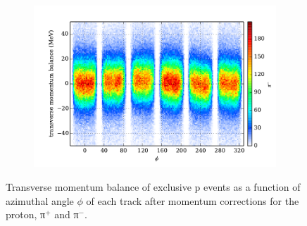 \begin{figure}
\begin{center}
\begin{subfigure}{0.4\columnwidth}
\end{subfigure}
\begin{subfigure}{0.4\columnwidth}
    \includegraphics[width=\columnwidth]{figures/pcor/pcor_mptbal_fixed_pim.pdf}
\end{subfigure}
\caption[Momentum Balance Before Corrections]{\label{fig:pbal}Transverse momentum balance of exclusive p \π[+] \π[-] events as a function of azimuthal angle $\phi$ of each track after momentum corrections for the proton, π$^+$ and π$^-$.}
\end{center}\end{figure}

